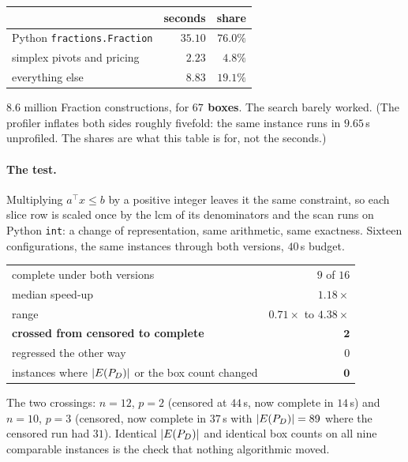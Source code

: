 \documentclass[11pt,a4paper]{article}
\begin{document}
\begin{center}
\begin{tabular}{lrr}
\toprule
 & seconds & share \\
\midrule
Python \texttt{fractions.Fraction}  & $35.10$ & $76.0\%$ \\
simplex pivots and pricing          & $2.23$  & $4.8\%$ \\
everything else                     & $8.83$  & $19.1\%$ \\
\bottomrule
\end{tabular}
\end{center}

\noindent
$8.6$ million Fraction constructions, for \textbf{$67$ boxes}.  The search
barely worked.  (The profiler inflates both sides roughly fivefold: the same
instance runs in $9.65$\,s unprofiled.  The shares are what this table is for,
not the seconds.)

\paragraph{The test.}  Multiplying $a^{\top}x \leqslant b$ by a positive
integer leaves it the same constraint, so each slice row is scaled once by the
lcm of its denominators and the scan runs on Python \texttt{int}: a change of
representation, same arithmetic, same exactness.  Sixteen configurations, the
same instances through both versions, $40$\,s budget.

\begin{center}
\begin{tabular}{lr}
\toprule
complete under both versions                    & $9$ of $16$ \\
\quad median speed-up                           & $\mathbf{1.18\times}$ \\
\quad range                                     & $0.71\times$ to $4.38\times$ \\
\midrule
\textbf{crossed from censored to complete}      & $\mathbf{2}$ \\
regressed the other way                         & $0$ \\
\midrule
instances where $|E(P_{D})|$ or the box count changed & $\mathbf{0}$ \\
\bottomrule
\end{tabular}
\end{center}

\noindent
The two crossings: $n{=}12$, $p{=}2$ (censored at $44$\,s, now complete in
$14$\,s) and $n{=}10$, $p{=}3$ (censored, now complete in $37$\,s with
$|E(P_{D})| = 89$ where the censored run had $31$).  Identical $|E(P_{D})|$ and identical
box counts on all nine comparable instances is the check that nothing
algorithmic moved.
\end{document}
